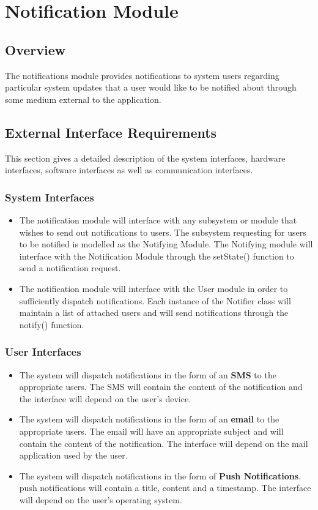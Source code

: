 \section{Notification Module}
\subsection{Overview}
The notifications module provides notifications to system users regarding particular system updates that a user would like to be notified about through some medium external to the application. 
\subsection{External Interface Requirements}
This section gives a detailed description of the system interfaces, hardware interfaces, software interfaces as well as communication interfaces.
\subsubsection{System Interfaces}
\begin{itemize}
	\item The notification module will interface with any subsystem or module that wishes to send out notifications to users. The subsystem requesting for users to be notified is modelled as the Notifying Module. The Notifying module will interface with the Notification Module through the setState() function to send a notification request. 
	
	\item The notification module will interface with the User module in order to sufficiently dispatch notifications. Each instance of the Notifier class will maintain a list of attached users and will send notifications through the notify() function.
\end{itemize}

\subsubsection{User Interfaces}
\begin{itemize}
	\item The system will dispatch notifications in the form of an \textbf{SMS} to the appropriate users. The SMS will contain the content of the notification and the interface will depend on the user's device.
	
	\item The system will dispatch notifications in the form of an \textbf{email} to the appropriate users. The email will have an appropriate subject and will contain the content of the notification. The interface will depend on the mail application used by the user.
	
	\item The system will dispatch notifications in the form of \textbf{Push Notifications}.  push notifications will contain a title, content and a timestamp. The interface will depend on the user's operating system. 
\end{itemize}

